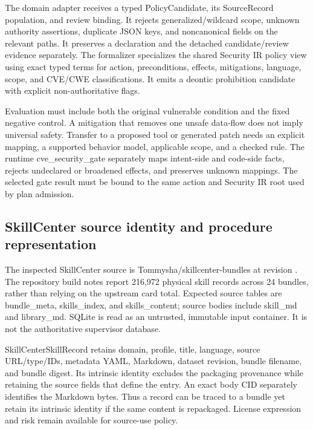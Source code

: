 \documentclass{article}
\begin{document}
The domain adapter receives a typed PolicyCandidate, its SourceRecord population, and review binding. It rejects generalized/wildcard scope, unknown authority assertions, duplicate JSON keys, and noncanonical fields on the relevant paths. It preserves a declaration and the detached candidate/review evidence separately. The formalizer specializes the shared Security IR policy view using exact typed terms for action, preconditions, effects, mitigations, language, scope, and CVE/CWE classifications. It emits a deontic prohibition candidate with explicit non-authoritative flags.

Evaluation must include both the original vulnerable condition and the fixed negative control. A mitigation that removes one unsafe data-flow does not imply universal safety. Transfer to a proposed tool or generated patch needs an explicit mapping, a supported behavior model, applicable scope, and a checked rule. The runtime cve\_\allowbreak{}security\_\allowbreak{}gate separately maps intent-side and code-side facts, rejects undeclared or broadened effects, and preserves unknown mappings. The selected gate result must be bound to the same action and Security IR root used by plan admission.

\subsection{SkillCenter source identity and procedure representation}

The inspected SkillCenter source is Tommysha/skillcenter-bundles at revision . The repository build notes report 216,972 physical skill records across 24 bundles, rather than relying on the upstream card total. Expected source tables are bundle\_\allowbreak{}meta, skills\_\allowbreak{}index, and skills\_\allowbreak{}content; source bodies include skill\_\allowbreak{}md and library\_\allowbreak{}md. SQLite is read as an untrusted, immutable input container. It is not the authoritative supervisor database.

SkillCenterSkillRecord retains domain, profile, title, language, source URL/type/IDs, metadata YAML, Markdown, dataset revision, bundle filename, and bundle digest. Its intrinsic identity excludes the packaging provenance while retaining the source fields that define the entry. An exact body CID separately identifies the Markdown bytes. Thus a record can be traced to a bundle yet retain its intrinsic identity if the same content is repackaged. License expression and risk remain available for source-use policy.
\end{document}
